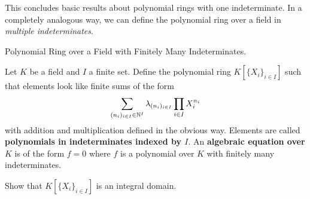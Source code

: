 \documentclass[../../book.tex]{subfiles}
\begin{document}
This concludes basic results about polynomial rings with one indeterminate.
In a completely analogous way, 
we can define the polynomial ring over a field in \emph{multiple indeterminates}. 

\begin{ex} Polynomial Ring over a Field with Finitely Many Indeterminates.
    
    Let $K$ be a field and $I$ a finite set. 
    Define the polynomial ring $K[\{X_i\}_{i \in I}]$
    such that elements look like finite sums of the form \[
        \sum_{(n_i)_{i\in I} \in \mathbb{N}^I} 
        \lambda_{(n_i)_{i\in I}} \prod_{i\in I} X_i^{n_i}
    \]
    with addition and multiplication defined in the obvious way. 
    Elements are called \textbf{polynomials in indeterminates indexed by $I$}.
    An \textbf{algebraic equation over $K$} is of the form $f = 0$ 
    where $f$ is a polynomial over $K$ with finitely many indeterminates. 

    Show that $K[\{X_i\}_{i \in I}]$ is an integral domain. 
\end{ex}

\end{document}
